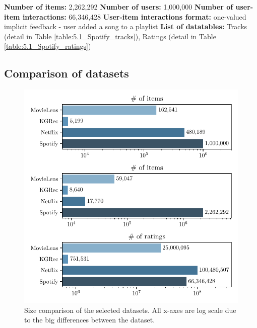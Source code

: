 \hfill \break
\noindent
\textbf{Number of items:} 2,262,292 \newline
\textbf{Number of users:} 1,000,000 \newline
\textbf{Number of user-item interactions:} 66,346,428 \newline
\textbf{User-item interactions format:} one-valued implicit feedback - user added a song to a playlist\newline
\textbf{List of datatables:} Tracks (detail in Table \ref{table:5.1_Spotify_tracks}), Ratings (detail in Table \ref{table:5.1_Spotify_ratings})




\subsection{Comparison of datasets}

\begin{figure}[ht!]
    \centering
    \includegraphics{img/figures/datasets_counts.pdf}
    \caption[Size comparison of the selected datasets.]{Size comparison of the selected datasets. All x-axes are log scale due to the big differences between the dataset.}
    \label{fig:datasets_counts}
\end{figure}

